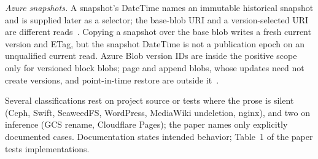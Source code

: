 \emph{Azure snapshots.} A snapshot's DateTime names an immutable historical
snapshot and is supplied later as a  selector; the base-blob URI
and a version-selected URI are different reads~\cite{azuresnapshot}. Copying a
snapshot over the base blob writes a fresh current version and ETag, but the
snapshot DateTime is not a publication epoch on an unqualified current read.
Azure Blob version IDs are inside the positive scope only for versioned block
blobs; page and append blobs, whose updates need not create versions, and
point-in-time restore are outside it~\cite{azureversioning}.

Several classifications rest on project source or tests where the prose is
silent (Ceph, Swift, SeaweedFS, WordPress, MediaWiki undeletion, nginx), and
two on inference (GCS rename, Cloudflare Pages); the paper names only
explicitly documented cases. Documentation states intended behavior;
Table~1 of the paper tests implementations.
